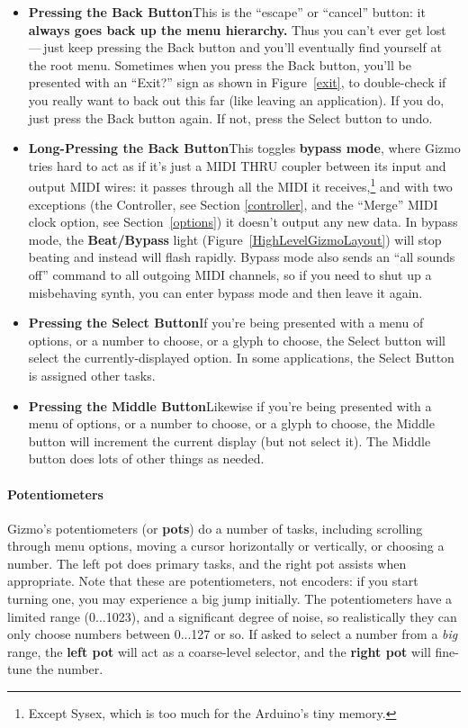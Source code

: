 \documentclass{article}
\begin{document}
\begin{itemize}
\item {\bf Pressing the Back Button}\quad This is the ``escape'' or ``cancel'' button: it {\bf always goes back up the menu hierarchy.}  Thus you can't ever get lost\,---\,just keep pressing the Back button and you'll eventually find yourself at the root menu.  Sometimes when you press the Back button, you'll be presented with an ``Exit?'' sign as shown in Figure~\ref{exit}, to double-check if you really want to back out this far (like leaving an application). If you do, just press the Back button again.  If not, press the Select button to undo.

\item {\bf Long-Pressing the Back Button}\quad This toggles {\bf bypass mode}, where Gizmo tries hard to act as if it's just a MIDI THRU coupler between its input and output MIDI wires: it passes through all the MIDI it receives,\footnote{Except Sysex, which is too much for the Arduino's tiny memory.} and with two exceptions (the Controller, see Section \ref{controller}, and the ``Merge'' MIDI clock option, see Section~\ref{options}) it doesn't output any new data.  In bypass mode, the {\bf Beat/Bypass} light (Figure~\ref{HighLevelGizmoLayout}) will stop beating and instead will flash rapidly.  Bypass mode also sends an ``all sounds off'' command to all outgoing MIDI channels, so if you need to shut up a misbehaving synth, you can enter bypass mode and then leave it again.

\item {\bf Pressing the Select Button}\quad If you're being presented with a menu of options, or a number to choose, or a glyph to choose, the Select button will select the currently-displayed option.  In some applications, the Select Button is assigned other tasks.

\item {\bf Pressing the Middle Button}\quad Likewise if you're being presented with a menu of options, or a number to choose, or a glyph to choose, the Middle button will increment the current display (but not select it).   The Middle button does lots of other things as needed.
\end{itemize}

\paragraph{Potentiometers}

Gizmo's potentiometers (or {\bf pots}) do a number of tasks, including scrolling through menu options, moving a cursor horizontally or vertically, or choosing a number.  The left pot does primary tasks, and the right pot assists when appropriate.  Note that these are potentiometers, not encoders: if you start turning one, you may experience a big jump initially.  The potentiometers have a limited range (0...1023), and a significant degree of noise, so realistically they can only choose numbers between 0...127 or so.  If asked to select a number from a {\it big} range, the {\bf left pot} will act as a coarse-level selector, and the {\bf right pot} will fine-tune the number.
\end{document}
